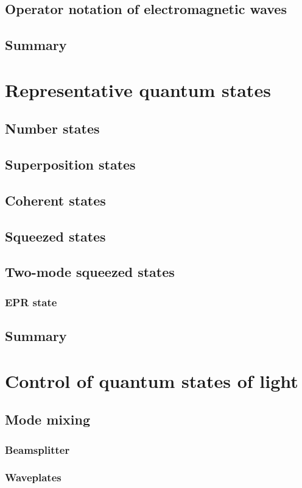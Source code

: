 \documentclass{book}
\begin{document}
\section{Operator notation of electromagnetic waves}
\section{Summary}

\chapter{Representative quantum states}
\section{Number states}
\section{Superposition states}
\section{Coherent states}
\section{Squeezed states}
\section{Two-mode squeezed states}
\subsection{EPR state}
\section{Summary}

\chapter{Control of quantum states of light}
\section{Mode mixing}
\subsection{Beamsplitter}
\subsection{Waveplates}
\end{document}

